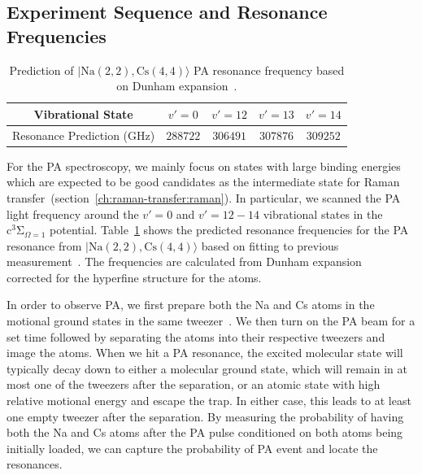 \subsection{Experiment Sequence and Resonance Frequencies}
\label{ch:pa:sequence-res}

\begin{table}
  \centering
  \caption[PA resonance prediction]{
    Prediction of $|\mathrm{Na(2, 2),Cs(4, 4)}\rangle$ PA resonance frequency
    based on Dunham expansion~\cite{grochola_spin-forbidden_2011,dunham_energy_1932}.
    \label{table:pa:theory-prediction}}
  \begin{tabular}{|c|c|c|c|c|}
    \hline
    Vibrational State&$v'=0$&$v'=12$&$v'=13$&$v'=14$\\\hline
    Resonance Prediction (GHz)&$288722$&$306491$&$307876$&$309252$\\\hline
  \end{tabular}
\end{table}

For the PA spectroscopy, we mainly focus on states with large binding energies
which are expected to be good candidates as the intermediate state
for Raman transfer~(section~\ref{ch:raman-transfer:raman}).
In particular, we scanned the PA light frequency around the $v'=0$ and $v'=12-14$
vibrational states in the $\mathrm{c^3\Sigma}_{\Omega=1}$ potential.
Table~\ref{table:pa:theory-prediction} shows the predicted resonance frequencies
for the PA resonance from $|\mathrm{Na(2, 2),Cs(4, 4)}\rangle$
based on fitting to previous measurement~\cite{grochola_spin-forbidden_2011}.
The frequencies are calculated from Dunham expansion~\cite{dunham_energy_1932}
corrected for the hyperfine structure for the atoms.

In order to observe PA, we first prepare both the Na and Cs atoms in the motional ground states
in the same tweezer~\cite{liu_building_2018}.
We then turn on the PA beam for a set time
followed by separating the atoms into their respective tweezers and image the atoms.
When we hit a PA resonance, the excited molecular state will typically decay down
to either a molecular ground state,
which will remain in at most one of the tweezers after the separation,
or an atomic state with high relative motional energy and escape the trap.
In either case, this leads to at least one empty tweezer after the separation.
By measuring the probability of having both the Na and Cs atoms after the PA pulse
conditioned on both atoms being initially loaded,
we can capture the probability of PA event and locate the resonances.

